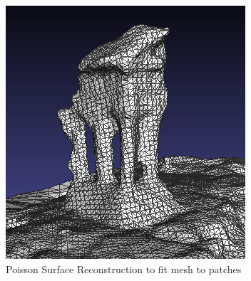 \documentclass[10pt,twocolumn,letterpaper]{article}
\begin{document}
\begin{figure}[t]
  \begin{center}
    \includegraphics[width=0.8\linewidth]{mesh.png}
  \end{center}
  \caption{Poisson Surface Reconstruction to fit mesh to patches}
  \label{fig:long}
  \label{fig:onecol}
\end{figure}




{\small


}
\end{document}

